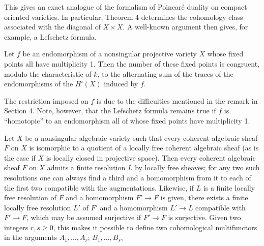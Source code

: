 This gives an exact analogue of the formalism of Poincaré duality on compact
oriented varieties. In particular, Theorem 4 determines the cohomology class
associated with the diagonal of $X\times X$. A well-known argument then gives,
for example, a Lefschetz formula.

 Let $f$ be an endomorphism of a nonsingular projective
variety $X$ whose fixed points all have multiplicity 1. Then the number of
these fixed points is congruent, modulo the characteristic of $k$, to the
alternating sum of the traces of the endomorphisms of the $H^{i}(X)$ induced by
$f$.

The restriction imposed on $f$ is due to the difficulties mentioned in the
remark in Section 4. Note, however, that the Lefschetz formula remains true if
$f$ is ``homotopic'' to an endomorphism all of whose fixed points have
multiplicity 1.


Let $X$ be a nonsingular algebraic variety such that every coherent algebraic
sheaf $F$ on $X$ is isomorphic to a quotient of a locally free coherent
algebraic sheaf (as is the case if $X$ is locally closed in projective space).
Then every coherent algebraic sheaf $F$ on $X$ admits a finite resolution $L$
by locally free sheaves; for any two such resolutions one can always find a
third and a homomorphism from it to each of the first two compatible with the
augmentations. Likewise, if $L$ is a finite locally free resolution of $F$ and
a homomorphism $F'\longrightarrow F$ is given, there exists a finite locally
free resolution $L'$ of $F'$ and a homomorphism $L'\longrightarrow L$
compatible with $F'\longrightarrow F$, which may be assumed surjective if
$F'\longrightarrow F$ is surjective. Given two integers $r,s\geq0$, this makes
it possible to define two cohomological multifunctors in the arguments
$A_1,\ldots,A_r$; $B_1,\ldots,B_s$,

